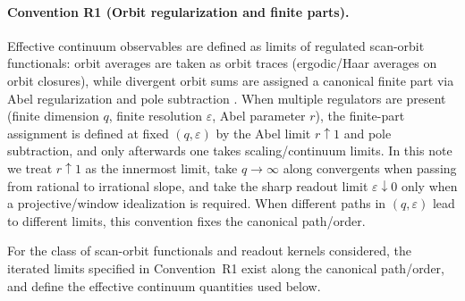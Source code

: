 \paragraph{Convention R1 (Orbit regularization and finite parts).}
Effective continuum observables are defined as limits of regulated scan-orbit functionals: orbit averages are taken as orbit traces (ergodic/Haar averages on orbit closures), while divergent orbit sums are assigned a canonical finite part via Abel regularization and pole subtraction \cite{Ma2025HPA}. When multiple regulators are present (finite dimension $q$, finite resolution $\varepsilon$, Abel parameter $r$), the finite-part assignment is defined at fixed $(q,\varepsilon)$ by the Abel limit $r\uparrow 1$ and pole subtraction, and only afterwards one takes scaling/continuum limits. In this note we treat $r\uparrow 1$ as the innermost limit, take $q\to\infty$ along convergents when passing from rational to irrational slope, and take the sharp readout limit $\varepsilon\downarrow 0$ only when a projective/window idealization is required. When different paths in $(q,\varepsilon)$ lead to different limits, this convention fixes the canonical path/order.
\begin{assumption}
\label{ass:R2}
For the class of scan-orbit functionals and readout kernels considered, the iterated limits specified in Convention~R1 exist along the canonical path/order, and define the effective continuum quantities used below.
\end{assumption}
